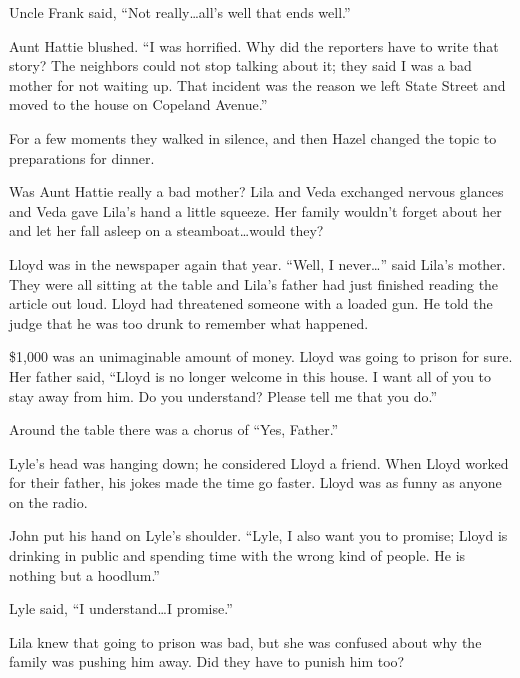 \documentclass[
  letterpaper,
]{book}
\begin{document}
Uncle Frank said, ``Not really\ldots all's well that ends well.''

Aunt Hattie blushed. ``I was horrified. Why did the reporters have to
write that story? The neighbors could not stop talking about it; they
said I was a bad mother for not waiting up. That incident was the reason
we left State Street and moved to the house on Copeland Avenue.''

For a few moments they walked in silence, and then Hazel changed the
topic to preparations for dinner.

Was Aunt Hattie really a bad mother? Lila and Veda exchanged nervous
glances and Veda gave Lila's hand a little squeeze. Her family wouldn't
forget about her and let her fall asleep on a steamboat\ldots would
they?

Lloyd was in the newspaper again that year. ``Well, I never\ldots{}''
said Lila's mother. They were all sitting at the table and Lila's father
had just finished reading the article out loud. Lloyd had threatened
someone with a loaded gun. He told the judge that he was too drunk to
remember what happened.

\$1,000 was an unimaginable amount of money. Lloyd was going to prison
for sure. Her father said, ``Lloyd is no longer welcome in this house. I
want all of you to stay away from him. Do you understand? Please tell me
that you do.''

Around the table there was a chorus of ``Yes, Father.''

Lyle's head was hanging down; he considered Lloyd a friend. When Lloyd
worked for their father, his jokes made the time go faster. Lloyd was as
funny as anyone on the radio.

John put his hand on Lyle's shoulder. ``Lyle, I also want you to
promise; Lloyd is drinking in public and spending time with the wrong
kind of people. He is nothing but a hoodlum.''

Lyle said, ``I understand\ldots I promise.''

Lila knew that going to prison was bad, but she was confused about why
the family was pushing him away. Did they have to punish him too?
\end{document}
